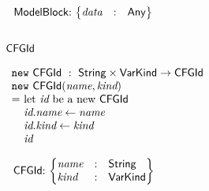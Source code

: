 \noindent
$
\begin{array}{@{~}r@{~}l@{}l@{~}l}
\\
& \ModelBlock & : &
\begin{Bmatrix*}[l]
\emph{data} & : & \Any \\
\end{Bmatrix*}\\
\end{array}
$

\subsection{$\mbox{\textsf{CFGId}}$}
$
\begin{array}{l@{}l@{~}l}
\lefteqn{\new \ \CFGId \ : \ \String \times \VarKind \rightarrow \CFGId}\\
\lefteqn{\new\ \CFGId(\emph{name}, \emph{kind})}\\
& = & \text{let } \emph{id} \text{ be a new } \CFGId\\
& & \emph{id}.\emph{name} \leftarrow \emph{name} \\
& & \emph{id}.\emph{kind} \leftarrow \emph{kind} \\
& & \emph{id}\\
\end{array}
$

\noindent
$
\begin{array}{@{~}r@{~}l@{}l@{~}l}
& \CFGId & : &
\begin{Bmatrix*}[l]
\emph{name} & : & \String\\
\emph{kind} & : & \VarKind\\
\end{Bmatrix*}\\
\end{array}
$
